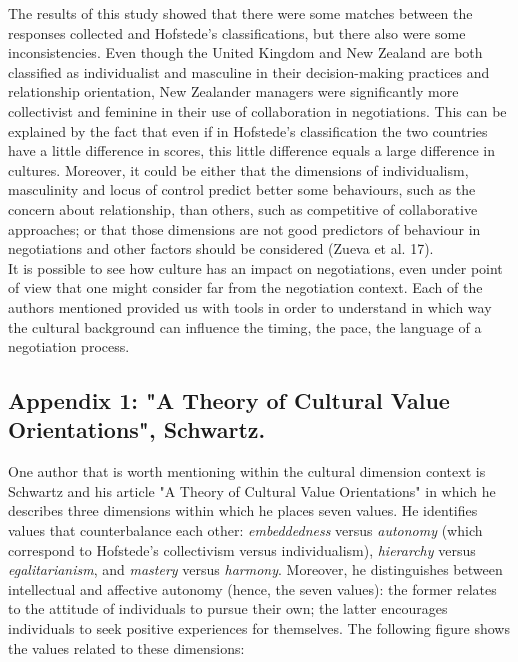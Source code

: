 \documentclass[../main.tex]{subfiles}
\begin{document}
The results of this study showed that there were some matches between the responses collected and Hofstede's classifications, but there also were some inconsistencies. Even though the United Kingdom and New Zealand are both classified as individualist and masculine in their decision-making practices and relationship orientation, New Zealander managers were significantly more collectivist and feminine in their use of collaboration in negotiations. This can be explained by the fact that even if in Hofstede's classification the two countries have a little difference in scores, this little difference equals a large difference in cultures. Moreover, it could be either that the dimensions of individualism, masculinity and locus of control predict better some behaviours, such as the concern about relationship, than others, such as competitive of collaborative approaches; or that those dimensions are not good predictors of behaviour in negotiations and other factors should be considered (Zueva et al. 17).\\

It is possible to see how culture has an impact on negotiations, even under point of view that one might consider far from the negotiation context. Each of the authors mentioned provided us with tools in order to understand in which way the cultural background can influence the timing, the pace, the language of a negotiation process.
\pagebreak

\subsection*{Appendix 1: "A Theory of Cultural Value Orientations", Schwartz.}

One author that is worth mentioning within the cultural dimension context is Schwartz and his article "A Theory of Cultural Value Orientations"\cite{schwartz} in which he describes three dimensions within which he places seven values. He identifies values that counterbalance each other: \textit{embeddedness} versus \textit{autonomy} (which correspond to Hofstede's collectivism versus individualism), \textit{hierarchy} versus \textit{egalitarianism}, and \textit{mastery} versus \textit{harmony}. Moreover, he distinguishes between intellectual and affective autonomy (hence, the seven values): the former relates to the attitude of individuals to pursue their own; the latter encourages individuals to seek positive experiences for themselves. The following figure shows the values related to these dimensions:
\end{document}
